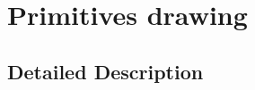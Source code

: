 \hypertarget{group____draw}{\section{Primitives drawing}
\label{group____draw}
}


\subsection{Detailed Description}
